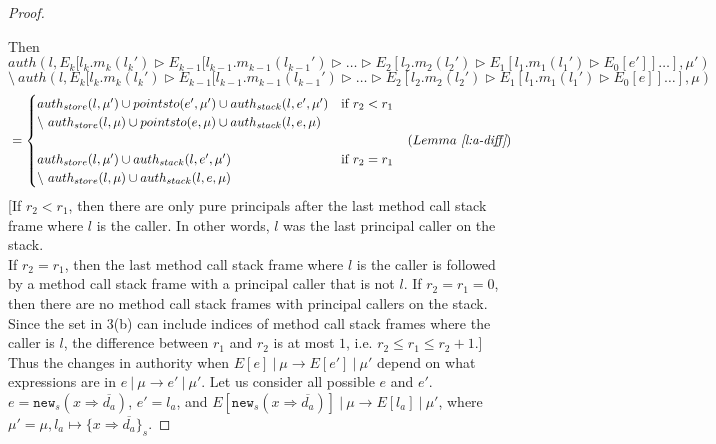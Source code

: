 \documentclass{llncs}
\newcommand{\keywadj}[1]{\mathtt{#1}}
\newcommand{\intuition}[1]{#1}
\begin{document}
\begin{proof}
\begin{enumerate}
\end{enumerate}
Then
\noindent$auth(l, E_k[l_k.m_k(l_k') \rhd E_{k-1}[l_{k-1}.m_{k-1}(l_{k-1}') \rhd \dots \rhd E_2[l_2.m_2(l_2') \rhd E_1[l_1.m_1(l_1') \rhd E_0[e']] \dots ], \mu')$\\
$\setminus~auth(l, E_k[l_k.m_k(l_k') \rhd E_{k-1}[l_{k-1}.m_{k-1}(l_{k-1}') \rhd \dots \rhd E_2[l_2.m_2(l_2') \rhd E_1[l_1.m_1(l_1') \rhd E_0[e]] \dots ], \mu)$
\vspace{-7pt}
\begin{align*}
&=
\begin{cases}
    auth_{store}(l, \mu') \cup pointsto(e', \mu') \cup auth_{stack}(l, e', \mu') & \text{if } r_2 < r_1\\
    \setminus~auth_{store}(l, \mu) \cup pointsto(e, \mu) \cup auth_{stack}(l, e, \mu)\\\\
    auth_{store}(l, \mu') \cup auth_{stack}(l, e', \mu')& \text{if } r_2 = r_1\\
    \setminus~auth_{store}(l, \mu) \cup auth_{stack}(l, e, \mu)
\end{cases} & (Lemma~\textit{\ref{l:a-diff}})
\end{align*}
\intuition{[If $r_2 < r_1$, then there are only pure principals after the last method call stack frame where $l$ is the caller. In other words, $l$ was the last principal caller on the stack.\\
If $r_2 = r_1$, then the last method call stack frame where $l$ is the caller is followed by a method call stack frame with a principal caller that is not $l$. If $r_2 = r_1 = 0$, then there are no method call stack frames with principal callers on the stack.\\
Since the set in 3(b) can include indices of method call stack frames where the caller is $l$, the difference between $r_1$ and $r_2$ is at most $1$, i.e. $r_2 \le r_1 \le r_2 + 1$.]}\\
Thus the changes in authority when $E[e]~|~\mu \longrightarrow E[e']~|~\mu'$ depend on what expressions are in $e~|~\mu \longrightarrow e'~|~\mu'$. Let us consider all possible $e$ and $e'$.\\


\noindent{}
\mbox{$e = \keywadj{new}_s(x \Rightarrow \overline{d_a})$}, \mbox{$e' = l_a$}, and \mbox{$E[\keywadj{new}_s(x \Rightarrow \overline{d_a})]~|~\mu \longrightarrow E[l_a]~|~\mu'$}, where\\
\mbox{$\mu' = \mu, l_a \mapsto \{ x \Rightarrow \overline{d_a} \}_s$}.


\end{proof}
\end{document}
